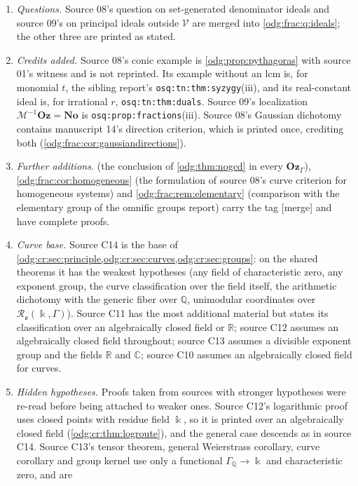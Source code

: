 \documentclass[11pt,oneside]{article}
\numberwithin{equation}{section}
\theoremstyle{definition}
\theoremstyle{remark}
\newcommand{\No}{\mathbf{No}}
\newcommand{\Oz}{\mathbf{Oz}}
\newcommand{\Q}{\mathbb Q}
\newcommand{\R}{\mathbb R}
\newcommand{\C}{\mathbb C}
\newcommand{\mergetag}{\textup{\textsf{\small[merge]}}}
\newcommand{\replabel}[1]{\nolinkurl{#1}}
\newcommand{\Vreg}{\mathcal V}
\begin{document}
\begin{enumerate}[leftmargin=*]
(\cref{odg:frac:ex:table}); the rows $m/n$, $r$ and $(t+r)/(t+1)$ occur in both.
\item \emph{Questions.} Source 08's question on set-generated denominator
ideals and source 09's on principal ideals outside $\Vreg$ are merged into
\cref{odg:frac:q:ideals}; the other three are printed as stated.
\item \emph{Credits added.} Source 08's conic example is
\cref{odg:prop:pythagoras} with source 01's witness and is not reprinted. Its
example without an lcm is, for monomial $t$, the sibling report's
\replabel{osq:tn:thm:syzygy}(iii), and its real-constant ideal is, for
irrational $r$, \replabel{osq:tn:thm:duals}. Source 09's localization
$\mathcal M^{-1}\Oz=\No$ is \replabel{osq:prop:fractions}(iii). Source 08's
Gaussian dichotomy contains manuscript 14's direction criterion, which is
printed once, crediting both (\cref{odg:frac:cor:gaussiandirections}).
\item \emph{Further additions.}  (the conclusion of
\cref{odg:thm:nogcd} in every $\Oz_\Gamma$), \cref{odg:frac:cor:homogeneous} (the
formulation of source 08's curve criterion for homogeneous systems) and
\cref{odg:frac:rem:elementary} (comparison with the elementary group of the
omnific groups report) carry the tag \mergetag{} and have complete proofs.
\item \emph{Curve base.} Source C14 is the base of
\cref{odg:cr:sec:principle,odg:cr:sec:curves,odg:cr:sec:groups}: on the shared
theorems it has the weakest hypotheses (any field of characteristic zero, any
exponent group, the curve classification over the field itself, the arithmetic
dichotomy with the generic fiber over $\Q$, unimodular coordinates over
$\mathcal R_{\mathfrak o}(\Bbbk,\Gamma)$). Source C11 has the most additional material
but states its classification over an algebraically closed field or $\R$; source C12
assumes an algebraically closed field throughout; source C13 assumes a divisible
exponent group and the fields $\R$ and $\C$; source C10 assumes an algebraically
closed field for curves.
\item \emph{Hidden hypotheses.} Proofs taken from sources with stronger hypotheses
were re-read before being attached to weaker ones. Source C12's logarithmic proof uses
closed points with residue field $\Bbbk$, so it is printed over an algebraically closed
field (\cref{odg:cr:thm:logroute}), and the general case descends as in source C14.
Source C13's tensor theorem, general Weierstrass corollary, curve corollary and group
kernel use only a functional $\Gamma_\Q\to\Bbbk$ and characteristic zero, and are

\end{enumerate}
\end{document}
